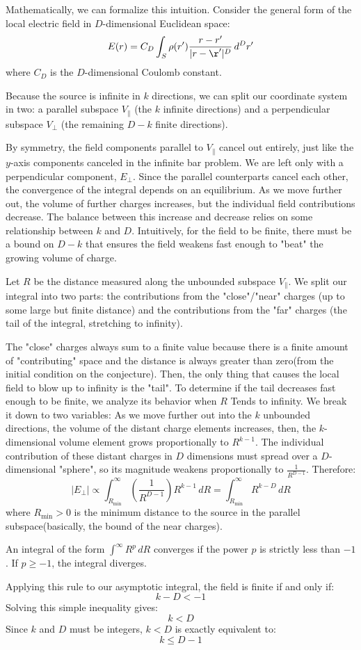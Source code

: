 \documentclass[12pt]{article}
\begin{document}
Mathematically, we can formalize this intuition. Consider the general form of the local electric field in $D$-dimensional Euclidean space:
\[
E(r) = C_D \int_S \rho(r') \frac{r - r'}{|r - \r'|^D} \, d^D r'
\]
where $C_D$ is the $D$-dimensional Coulomb constant. 

\[\]
Because the source is infinite in $k$ directions, we can split our coordinate system in two: a parallel subspace $V_{\parallel}$ (the $k$ infinite directions) and a perpendicular subspace $V_{\perp}$ (the remaining $D-k$ finite directions). 

By symmetry, the field components parallel to $V_{\parallel}$ cancel out entirely, just like the $y$-axis components canceled in the infinite bar problem. We are left only with a perpendicular component, $E_{\perp}$. 
Since the parallel counterparts cancel each other, the convergence of the integral depends on an equilibrium. As we move further out, the volume of further charges increases, but the individual field contributions decrease. The balance between this increase and decrease relies on some relationship between $k$ and $D$. Intuitively, for the field to be finite, there must be a bound on $D-k$ that ensures the field weakens fast enough to "beat" the growing volume of charge.
\[\]

Let $R$ be the distance measured along the unbounded subspace $V_{\parallel}$. We split our integral into two parts: the contributions from the "close"/"near" charges (up to some large but finite distance) and the contributions from the "far" charges (the tail of the integral, stretching to infinity). 

The "close" charges always sum to a finite value because there is a finite amount of "contributing" space and the distance is always greater than zero(from the initial condition on the conjecture). Then, the only thing that causes the local field to blow up to infinity is the "tail". To determine if the tail decreases fast enough to be finite, we analyze its behavior when $R$ Tends to infinity.
We break it down to two variables:
As we move further out into the $k$ unbounded directions, the volume of the distant charge elements increases, then, the $k$-dimensional volume element grows proportionally to $R^{k-1}$.
The individual contribution of these distant charges in $D$ dimensions must spread over a $D$-dimensional "sphere", so its magnitude weakens proportionally to $\frac{1}{R^{D-1}}$.
Therefore:
\[
|E_{\perp}| \propto \int_{R_{\text{min}}}^{\infty} \left( \frac{1}{R^{D-1}} \right) R^{k-1} \, dR = \int_{R_{\text{min}}}^{\infty} R^{k - D} \, dR
\]
where $R_{\text{min}} > 0$ is the minimum distance to the source in the parallel subspace(basically, the bound of the near charges).

An integral of the form $\int^{\infty} R^p \, dR$ converges if the power $p$ is strictly less than $-1$. If $p \geq -1$, the integral diverges. 

Applying this rule to our asymptotic integral, the field is finite if and only if:
\[
k - D < -1
\]
Solving this simple inequality gives:
\[
k < D
\]
Since $k$ and $D$ must be integers, $k < D$ is exactly equivalent to:
\[
\boxed{k \leq D - 1}
\]
\end{document}
